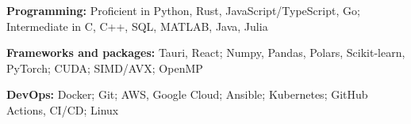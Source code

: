 \begin{enumerate}[label={[\arabic*]},nosep]
  \item \textbf{Programming:} Proficient in Python, Rust, JavaScript/TypeScript, Go; Intermediate in C, C++, SQL, MATLAB, Java, Julia
  \item \textbf{Frameworks and packages:} Tauri, React; Numpy, Pandas, Polars, Scikit-learn, PyTorch; CUDA; SIMD/AVX; OpenMP
  \item \textbf{DevOps:} Docker; Git; AWS, Google Cloud; Ansible; Kubernetes; GitHub Actions, CI/CD; Linux
\end{enumerate}
